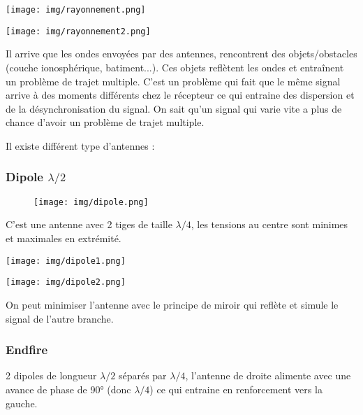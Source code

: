 		\begin{minipage}{.5\textwidth}
  \centering
  \texttt{[image: img/rayonnement.png]}
\end{minipage}%
\begin{minipage}{.5\textwidth}
  \centering
  \texttt{[image: img/rayonnement2.png]}
\end{minipage}

	Il arrive que les ondes envoyées par des antennes, rencontrent des objets/obstacles (couche ionosphérique, batiment...). Ces objets reflètent les ondes et entraînent un problème de trajet multiple. C'est un problème qui fait que le même signal arrive à des moments différents chez le récepteur ce qui entraine des dispersion et de la désynchronisation du signal. On sait qu'un signal qui varie vite a plus de chance d'avoir un problème de trajet multiple.
	
	Il existe différent type d'antennes :
	
	\subsubsection{Dipole $\lambda/2$}
	
		\begin{figure}[H]
			\centering
			\texttt{[image: img/dipole.png]}
		\end{figure}
		
		C'est une antenne avec 2 tiges de taille $\lambda /4$, les tensions au centre sont minimes et maximales en extrémité.
	
		\begin{minipage}{.6\textwidth}
  \centering
  \texttt{[image: img/dipole1.png]}

\end{minipage}%
\begin{minipage}{.5\textwidth}
  \centering
  \texttt{[image: img/dipole2.png]}

\end{minipage}
		On peut minimiser l'antenne avec le principe de miroir qui reflète et simule le signal de l'autre branche.
		
	\subsubsection{Endfire}
		2 dipoles de longueur $\lambda/2$ séparés par $\lambda/4$, l'antenne de droite alimente avec une avance de phase de 90° (donc $\lambda/4$) ce qui entraine en renforcement vers la gauche.
		
